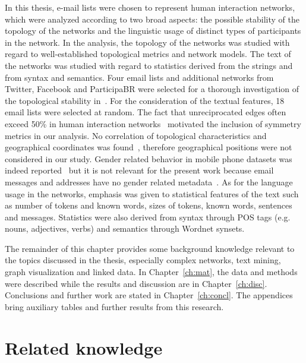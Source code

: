 In this thesis, e-mail lists were chosen to represent human interaction networks, which were analyzed according to two broad aspects: the possible stability of the topology of the networks and the linguistic usage of distinct types of participants in the network. In the analysis, the topology of the networks was studied with regard to well-established topological metrics and network models. The text of the networks was studied with regard to statistics derived from the strings and from syntax and semantics.
Four email lists and additional networks from Twitter, Facebook and ParticipaBR were selected for a thorough investigation of
the topological stability in~\cite{stab}.
For the consideration of the textual features,
18 email lists were selected at random.
The fact that unreciprocated edges often exceed 50\% in human interaction networks~\cite{newmanEvolving} motivated the inclusion of symmetry metrics in our analysis. 
No correlation of topological characteristics and geographical coordinates was found~\cite{barabasiGeo},
therefore geographical positions were not considered in our study.
Gender related behavior in mobile phone datasets was indeed reported~\cite{barabasiSex}
but it is not relevant for the present work because email messages and addresses have no gender related metadata~\cite{gmanePack}. As for the language usage in the networks, emphasis was given to statistical features of the text such as number of tokens and known words, sizes of tokens, known words, sentences and messages. 
Statistics were also derived from syntax through POS tags (e.g. nouns, adjectives, verbs) and semantics through Wordnet synsets.

The remainder of this chapter provides some background knowledge relevant to the topics discussed in the thesis, especially complex networks, text mining, graph visualization and linked data. In Chapter~\ref{ch:mat}, the data and methods were described while the results and discussion are in Chapter~\ref{ch:disc}. 
Conclusions and further work are stated in Chapter~\ref{ch:concl}.
The appendices bring auxiliary tables and further results from this research.


\section{Related knowledge}
